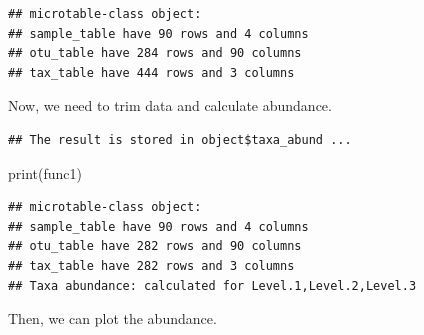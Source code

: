 \documentclass[
]{book}
\newenvironment{Shaded}{\begin{snugshade}}{\end{snugshade}}
\newcommand{\AttributeTok}[1]{\textcolor[rgb]{0.77,0.63,0.00}{#1}}
\newcommand{\CommentTok}[1]{\textcolor[rgb]{0.56,0.35,0.01}{\textit{#1}}}
\newcommand{\ConstantTok}[1]{\textcolor[rgb]{0.00,0.00,0.00}{#1}}
\newcommand{\FunctionTok}[1]{\textcolor[rgb]{0.00,0.00,0.00}{#1}}
\newcommand{\NormalTok}[1]{#1}
\newcommand{\OtherTok}[1]{\textcolor[rgb]{0.56,0.35,0.01}{#1}}
\newcommand{\SpecialCharTok}[1]{\textcolor[rgb]{0.00,0.00,0.00}{#1}}
\newcommand{\StringTok}[1]{\textcolor[rgb]{0.31,0.60,0.02}{#1}}
\begin{document}
\begin{verbatim}
## microtable-class object:
## sample_table have 90 rows and 4 columns
## otu_table have 284 rows and 90 columns
## tax_table have 444 rows and 3 columns
\end{verbatim}

Now, we need to trim data and calculate abundance.

\begin{Shaded}
\end{Shaded}

\begin{verbatim}
## The result is stored in object$taxa_abund ...
\end{verbatim}

\begin{Shaded}
\begin{Highlighting}[]
\FunctionTok{print}\NormalTok{(func1)}
\end{Highlighting}
\end{Shaded}

\begin{verbatim}
## microtable-class object:
## sample_table have 90 rows and 4 columns
## otu_table have 282 rows and 90 columns
## tax_table have 282 rows and 3 columns
## Taxa abundance: calculated for Level.1,Level.2,Level.3
\end{verbatim}

Then, we can plot the abundance.

\begin{Shaded}
\end{Shaded}
\end{document}
